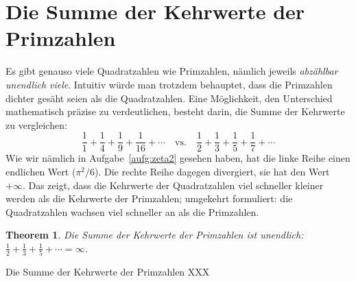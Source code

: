 \documentclass[twoside]{../zirkelblatt1415}
\theoremstyle{definition}
\theoremstyle{plain}
\newtheorem{thm}[defn]{Theorem}
\theoremstyle{remark}
\begin{document}


\section{Die Summe der Kehrwerte der Primzahlen}

Es gibt genauso viele Quadratzahlen wie Primzahlen, nämlich jeweils
\emph{abzählbar unendlich viele}. Intuitiv würde man trotzdem behauptet, dass
die Primzahlen dichter gesäht seien als die Quadratzahlen. Eine Möglichkeit,
den Unterschied mathematisch präzise zu verdeutlichen, besteht darin, die Summe
der Kehrwerte zu vergleichen:
\[ \frac{1}{1} + \frac{1}{4} + \frac{1}{9} + \frac{1}{16} + \cdots
  \quad\text{vs.}\quad
  \frac{1}{2} + \frac{1}{3} + \frac{1}{5} + \frac{1}{7} + \cdots \]
Wie wir nämlich in Aufgabe~\ref{aufg:zeta2} gesehen haben, hat die linke Reihe
einen endlichen Wert ($\pi^2/6$). Die rechte Reihe dagegen divergiert, sie hat
den Wert~$+\infty$. Das zeigt, dass die Kehrwerte der Quadratzahlen viel schneller
kleiner werden als die Kehrwerte der Primzahlen; umgekehrt formuliert: die
Quadratzahlen wachsen viel schneller an als die Primzahlen.

\begin{thm}Die Summe der Kehrwerte der Primzahlen ist unendlich:
$\frac{1}{2} + \frac{1}{3} + \frac{1}{5} + \cdots = \infty$.
\end{thm}

\begin{aufgabe}{Die Summe der Kehrwerte der Primzahlen}
XXX
\end{aufgabe}
\end{document}
